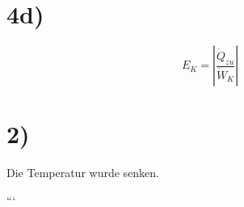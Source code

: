 

\section*{4d)}
\begin{equation*}
E_K = \left| \frac{\dot{Q}_{zu}}{\dot{W}_K} \right|
\end{equation*}

\section*{2)}
Die Temperatur wurde senken.

```